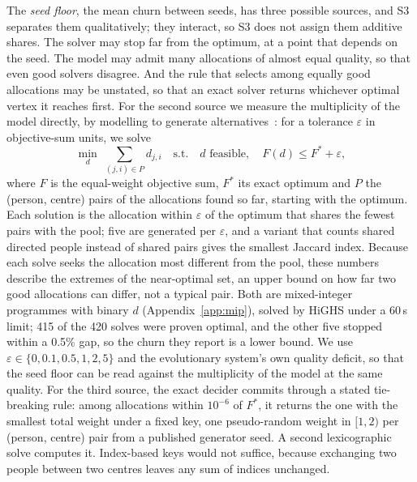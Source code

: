 \documentclass[systems,article,submit,moreauthors,pdftex]{Definitions/mdpi}
\begin{document}
The \emph{seed floor}, the mean churn between seeds, has three possible sources, and S3
separates them qualitatively; they interact, so S3 does not assign them additive shares. The solver may stop far from the optimum, at a point that depends on the
seed. The model may admit many allocations of almost equal quality, so that even good
solvers disagree. And the rule that selects among equally good allocations may be unstated,
so that an exact solver returns whichever optimal vertex it reaches first. For the second
source we measure the multiplicity of the model directly, by modelling to generate
alternatives~\cite{brill1982mga}: for a tolerance $\varepsilon$ in objective-sum units, we
solve
\begin{equation}
\min_{d}\; \sum_{(j,i) \in P} d_{j,i}
\quad\text{s.t.}\quad d \text{ feasible},\quad F(d) \le F^\ast + \varepsilon,
\label{eq:mga}
\end{equation}
where $F$ is the equal-weight objective sum, $F^\ast$ its exact optimum and $P$ the
(person, centre) pairs of the allocations found so far, starting with the optimum. Each
solution is the allocation within $\varepsilon$ of the optimum that shares the fewest pairs
with the pool; five are generated per $\varepsilon$, and a variant that counts shared
directed people instead of shared pairs gives the smallest Jaccard index. Because each solve
seeks the allocation most different from the pool, these numbers describe the extremes of the
near-optimal set, an upper bound on how far two good allocations can differ, not a typical
pair. Both are
mixed-integer programmes with binary $d$ (Appendix~\ref{app:mip}), solved by HiGHS under a
60\,s limit; 415 of the 420 solves were proven optimal, and the other five stopped within a
0.5\% gap, so the churn they report is a lower bound. We use $\varepsilon \in \{0, 0.1, 0.5, 1, 2, 5\}$ and
the evolutionary system's own quality deficit, so that the seed floor can be read against the
multiplicity of the model at the same quality. For the third source, the exact decider
commits through a stated tie-breaking rule: among allocations within $10^{-6}$ of $F^\ast$, it
returns the one with the smallest total weight under a fixed key, one pseudo-random weight in
$[1, 2)$ per (person, centre) pair from a published generator seed. A second lexicographic
solve computes it. Index-based keys would not suffice, because exchanging two people between
two centres leaves any sum of indices unchanged.
\end{document}
